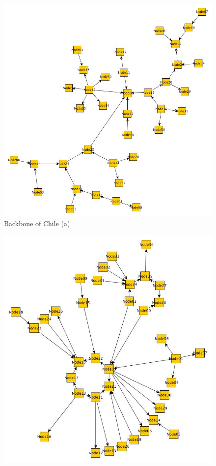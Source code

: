 \begin{figure}[h!]
   \begin{minipage}[t]{0.45\textwidth}
      \vspace{0pt}
      \includegraphics[width=\linewidth]{Reuna.jpg}
      Backbone of Chile (a)
   \end{minipage}
   \hfill
   \begin{minipage}[t]{0.45\textwidth}
      \vspace{0pt}
      \includegraphics[width=\linewidth]{Bren.jpg}

\end{minipage}
\end{figure}
